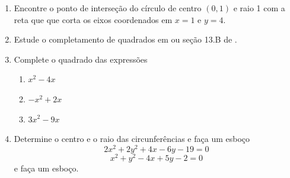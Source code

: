 \begin{frame}[label=circulo]
\begin{casa}
\begin{enumerate}
\item  Encontre o ponto de interseção do círculo de centro \((0,1)\) e raio 1 com a reta que que corta os eixos coordenados em \(x=1\) e \(y=4\). 
\item Estude o completamento de quadrados em \href{https://www.youtube.com/watch?v=n9rcwkkl8vk}{} ou seção 13.B de 
\href{https://demarque.mat.br/gaal/Boulos-Pre-Calculo.pdf\#page=79}{}.

\item Complete o quadrado das expressões
\begin{enumerate}[a]
\item $x^2-4x$
	\item $-x^2+2x$
	\item $3x^2-9x$
\end{enumerate}
\item Determine o centro e o raio das circunferências e faça um esboço
\[2x^2+2y^2+4x-6y-19=0\]
\[x^2+y^2-4x+5y-2=0\]
e faça um esboço.
\end{enumerate}
\end{casa}
\end{frame}

